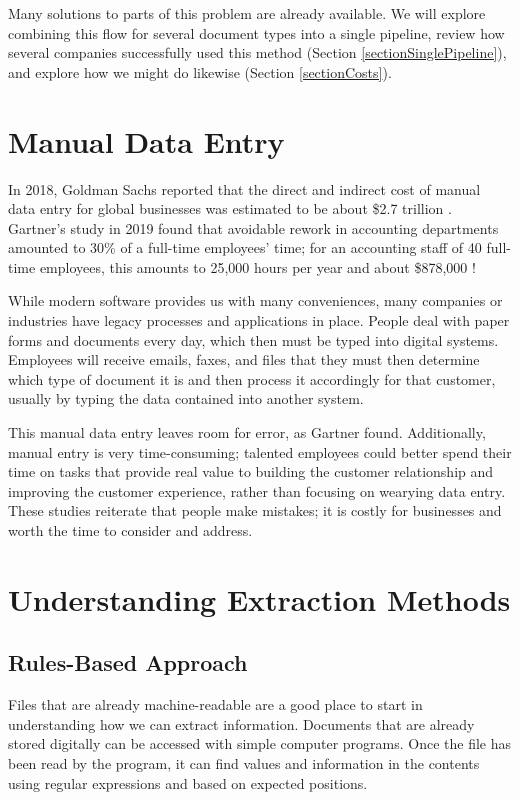 \documentclass[conference]{IEEEtran}
\begin{document}
Many solutions to parts of this problem are already available. We will explore combining this flow for several document types into a single pipeline, review how several companies successfully used this method (Section \ref{sectionSinglePipeline}), and explore how we might do likewise (Section \ref{sectionCosts}).

\section{Manual Data Entry} \label{sectionManualDataEntry}
In 2018, Goldman Sachs reported that the direct and indirect cost of manual data entry for global businesses was estimated to be about \$2.7 trillion \cite{schneider2018b2b}. Gartner's study in 2019 found that avoidable rework in accounting departments amounted to 30\% of a full-time employees' time; for an accounting staff of 40 full-time employees, this amounts to 25,000 hours per year and about \$878,000 \cite{lavelle2019gartner}!

While modern software provides us with many conveniences, many companies or industries have legacy processes and applications in place. People deal with paper forms and documents every day, which then must be typed into digital systems. Employees will receive emails, faxes, and files that they must then determine which type of document it is and then process it accordingly for that customer, usually by typing the data contained into another system.

This manual data entry leaves room for error, as Gartner found. Additionally, manual entry is very time-consuming; talented employees could better spend their time on tasks that provide real value to building the customer relationship and improving the customer experience, rather than focusing on wearying data entry. These studies reiterate that people make mistakes; it is costly for businesses and worth the time to consider and address.

\section{Understanding Extraction Methods} \label{sectionExtractionMethods}

\subsection{Rules-Based Approach}
Files that are already machine-readable are a good place to start in understanding how we can extract information. Documents that are already stored digitally can be accessed with simple computer programs. Once the file has been read by the program, it can find values and information in the contents using regular expressions and based on expected positions.
\end{document}
